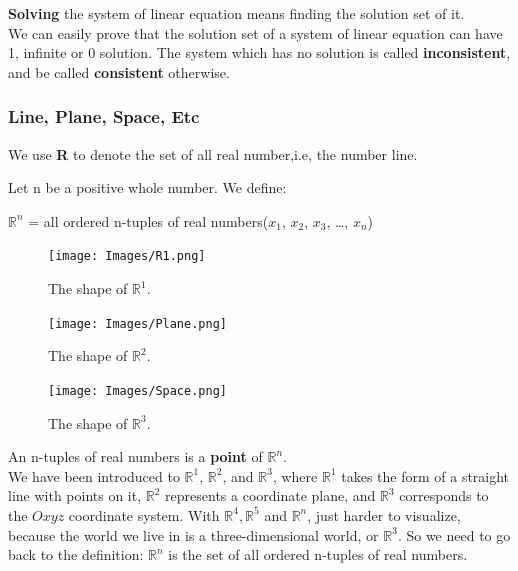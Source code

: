 \documentclass[a4paper,12pt]{article}
\begin{document}
\begin{frame}
        \textbf{Solving} the system of linear equation means finding the solution set of it.\\

        We can easily prove that the solution set of a system of linear equation can have 1, infinite or 0 solution. The system which has no solution is called \textbf{inconsistent}, and be called \textbf{consistent} otherwise.

        
        
    \end{frame}

\Large \subsubsection{Line, Plane, Space, Etc}
    \begin{frame}
        \small 
        
        \small We use \textbf{R} to denote the set of all real number,i.e, the number line.

        \begin{tcolorbox}[title=Definition,colframe=blue!70!black, colback=blue!5!white]
        Let n be a positive whole number. We define:
        \begin{center}
            \small \( \mathbb{R}^{n} \) = all ordered n-tuples of real numbers(\(x_1\), \(x_2\), \(x_3\), \dots , \(x_n\))
        \end{center}
        \end{tcolorbox}
        \newpage
    \begin{figure}[H]
        \centering
        \texttt{[image: Images/R1.png]}
        \caption{The shape of \( \mathbb{R}^1 \).}
        \label{fig:enter-label}
    \end{figure}
    \begin{figure}[H]
        \centering
        \texttt{[image: Images/Plane.png]}
        \caption{The shape of \(\mathbb{R}^2\).}
        \label{fig:enter-label}
    \end{figure}
    \begin{figure}[H]
        \centering
        \texttt{[image: Images/Space.png]}
        \caption{The shape of \(\mathbb{R}^3\).}
        \label{fig:enter-label}
    \end{figure}
    \newpage
    An n-tuples of real numbers is a \textbf{point}  of \( \mathbb{R}^{n} \).
        \\
        We have been introduced to \( \mathbb{R}^1 \), \( \mathbb{R}^2 \), and \( \mathbb{R}^3 \), where \( \mathbb{R}^1 \) takes the form of a straight line with points on it, \( \mathbb{R}^2 \) represents a coordinate plane, and \( \mathbb{R}^3 \) corresponds to the \( Oxyz \) coordinate system.
    \small With \(\mathbb{R}^4, \mathbb{R}^5\) and \(\mathbb{R}^n\), just harder to visualize, because the world we live in is a three-dimensional world, or \(\mathbb{R}^3\). So we need to go back to the definition: \(\mathbb{R}^n\) is the set of all ordered n-tuples of real numbers.\\ 
    

\end{frame}
\end{document}
